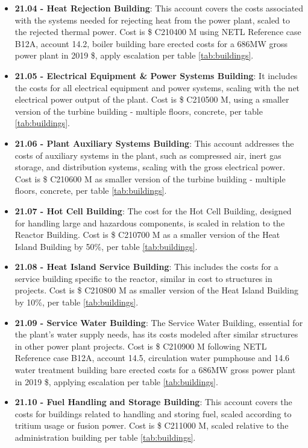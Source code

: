 \begin{itemize}
\item \textbf{21.04 - Heat Rejection Building}: This account covers the costs associated with the systems needed for rejecting heat from the power plant, scaled to the rejected thermal power. Cost is \$ C210400 M using NETL Reference case B12A, account 14.2, boiler building bare erected costs for a 686MW gross power plant in 2019 \$, apply escalation per table \ref{tab:buildings}. 
\item \textbf{21.05 - Electrical Equipment \& Power Systems Building}: It includes the costs for all electrical equipment and power systems, scaling with the net electrical power output of the plant. Cost is \$ C210500 M, using a smaller version of the turbine building - multiple floors, concrete, per table \ref{tab:buildings}.
\item \textbf{21.06 - Plant Auxiliary Systems Building}: This account addresses the costs of auxiliary systems in the plant, such as compressed air, inert gas storage, and distribution systems, scaling with the gross electrical power. Cost is \$ C210600 M as smaller version of the turbine building - multiple floors, concrete, per table \ref{tab:buildings}. 
\item \textbf{21.07 - Hot Cell Building}: The cost for the Hot Cell Building, designed for handling large and hazardous components, is scaled in relation to the Reactor Building.  Cost is \$ C210700 M as a smaller version of the Heat Island Building by 50\%, per table \ref{tab:buildings}.  
\item \textbf{21.08 - Heat Island Service Building}: This includes the costs for a service building specific to the reactor, similar in cost to structures in projects. Cost is \$ C210800 M as smaller version of the Heat Island Building by 10\%, per table \ref{tab:buildings}.  
\item \textbf{21.09 - Service Water Building}: The Service Water Building, essential for the plant’s water supply needs, has its costs modeled after similar structures in other power plant projects. Cost is \$ C210900 M following NETL Reference case B12A, account 14.5, circulation water pumphouse and 14.6 water treatment building bare erected costs for a 686MW gross power plant in 2019 \$, applying escalation per table \ref{tab:buildings}.
\item \textbf{21.10 - Fuel Handling and Storage Building}: This account covers the costs for buildings related to handling and storing fuel, scaled according to tritium usage or fusion power. Cost is \$ C211000 M, scaled relative to the administration building per table \ref{tab:buildings}. 

\end{itemize}
